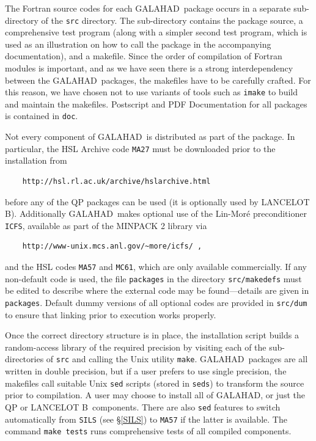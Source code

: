 \documentclass[twoside]{article}
\newcommand{\gal}{{\sf GALAHAD}}
\newcommand{\lanb}{{\sf LANCELOT B}}
\begin{document}
The Fortran source codes for each \gal\ package occurs 
in a separate sub-directory of the {\tt src} directory. The sub-directory
contains the package source, a comprehensive test program (along with
a simpler second test program, which is used as an illustration on how
to call the package in the accompanying documentation), and a makefile.
Since the order of compilation of Fortran modules is important, and as
we have seen there is a strong interdependency between the \gal\ packages,
the makefiles have to be carefully crafted. For this reason,
we have chosen not to use variants of tools such as 
{\tt imake} to build and
maintain the makefiles. Postscript and PDF Documentation for all packages
is contained in {\tt doc}.

Not every component of \gal\ is distributed as part of the package. In
particular, the HSL Archive code {\tt MA27} must be downloaded prior to 
the installation from
\begin{verbatim}
    http://hsl.rl.ac.uk/archive/hslarchive.html 
\end{verbatim}
before any of the QP packages can be used (it is optionally used by \lanb).
Additionally \gal\ makes optional use of the 
Lin-Mor\'{e} preconditioner {\tt ICFS}, available as
part of the MINPACK 2 library via
\begin{verbatim}
    http://www-unix.mcs.anl.gov/~more/icfs/ ,
\end{verbatim}
and the HSL codes {\tt MA57} and {\tt MC61}, which are only available
commercially. If any non-default code is used, the file {\tt packages}
in the directory {\tt src/makedefs} must be edited to describe where
the external code may be found---details are given in {\tt packages}.
Default dummy versions of all optional codes are provided in 
{\tt src/dum} to ensure that linking prior to execution works properly.

Once the correct directory structure is in place, the installation script
builds a random-access library of the required precision by visiting each 
of the sub-directories of {\tt src} and calling the Unix utility {\tt make}.
\gal\ packages are all written in double precision, but if a user prefers to
use single precision, the makefiles call suitable Unix {\tt sed} 
scripts (stored in {\tt seds}) to transform the source prior to compilation.
A user may choose to install all of \gal, or just the QP or \lanb\ components.
There are also {\tt sed} features to switch automatically from {\tt SILS} (see
 \S\ref{SILS}) to {\tt MA57} if the latter is available.
The command {\tt make tests} runs comprehensive tests of all 
compiled components.
\end{document}

